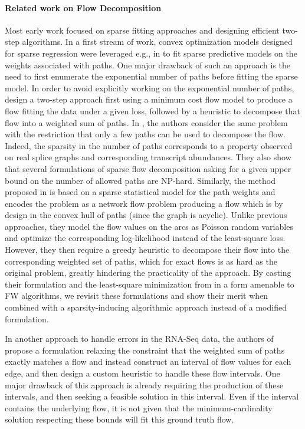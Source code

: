 \documentclass{ecai}
\begin{document}
\paragraph*{Related work on Flow Decomposition\\}
Most early work focused on sparse fitting approaches and designing efficient two-step algorithms.
In a first stream of work, convex optimization models designed for sparse regression were leveraged e.g., in \cite{li2011isolasso,li2011sparse} to fit sparse predictive models on the weights associated with paths. One major drawback of such an approach is the need to first enumerate the exponential number of paths before fitting the sparse model.
In order to avoid explicitly working on the exponential number of paths, \cite{tomescu2013novel} design a two-step approach first using a minimum cost flow model to produce a flow fitting the data under a given loss, followed by a heuristic to decompose that flow into a weighted sum of paths.
In \cite{tomescu2015explaining}, the authors consider the same problem with the restriction that only a few paths can be used to decompose the flow.
Indeed, the sparsity in the number of paths corresponds to a property observed on real splice graphs and corresponding transcript abundances.
They also show that several formulations of sparse flow decomposition asking for a given upper bound on the number of allowed paths are NP-hard.
Similarly, the method proposed in \cite{bernard2014efficient} is based on a sparse statistical model for the path weights and encodes the problem as a network flow problem producing a flow which is by design in the convex hull of paths (since the graph is acyclic).
Unlike previous approaches, they model the flow values on the arcs as Poisson random variables and optimize the corresponding log-likelihood instead of the least-square loss.
However, they then require a greedy heuristic to decompose their flow into the corresponding weighted set of paths, which for exact flows is as hard as the original problem, greatly hindering the practicality of the approach.
By casting their formulation and the least-square minimization from \cite{tomescu2013novel} in a form amenable to FW algorithms, we revisit these formulations and show their merit when combined with a sparsity-inducing algorithmic approach instead of a modified formulation.

In another approach to handle errors in the RNA-Seq data, the authors of \cite{williams2019rna} propose a formulation relaxing the constraint that the weighted sum of paths exactly matches a flow
and instead construct an interval of flow values for each edge, and then design a custom heuristic to handle these flow intervals.
One major drawback of this approach is already requiring the production of these intervals, and then seeking a feasible solution in this interval.
Even if the interval contains the underlying flow, it is not given that the minimum-cardinality solution respecting these bounds will fit this ground truth flow.
\end{document}
